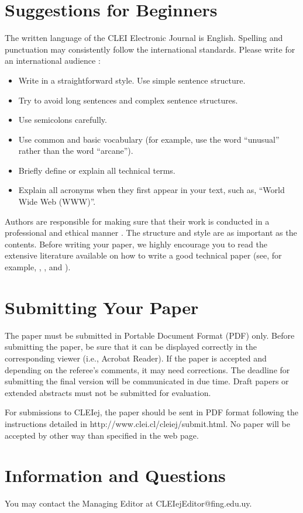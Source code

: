 \documentclass{cleiej}
\begin{document}
\section{Suggestions for Beginners}
The written language of the CLEI Electronic Journal is English. Spelling and punctuation 
may consistently follow the international standards. Please write for an international 
audience \cite{Smalzer}:
\begin{itemize}
\item Write in a straightforward style. Use simple sentence structure. 
\item Try to avoid long sentences and complex sentence structures. 
\item Use semicolons carefully.
\item Use common and basic vocabulary (for example, use the word ``unusual'' rather than the word ``arcane'').
\item Briefly define or explain all technical terms.
\item Explain all acronyms when they first appear in your text, such as, ``World Wide Web (WWW)''.
\end{itemize}
Authors are responsible for making sure that their work is conducted in a professional and ethical manner \cite{Anderson}.
The structure and style are as important as the contents. Before writing your paper, we highly encourage 
you to read the extensive literature available on how to write a good technical paper 
(see, for example, \cite{Harmon}, \cite{Pierson}, and \cite{Strunk}).

\section{Submitting Your Paper}
The paper must be submitted in Portable Document Format (PDF) only. Before submitting the paper, be sure that it can be displayed correctly in the corresponding viewer (i.e., Acrobat Reader). If the paper is accepted and depending on the referee's comments, it may need corrections. The deadline for submitting the final version will be communicated in due time. Draft papers or extended abstracts must not be submitted for evaluation. 

For submissions to CLEIej, the paper should be sent in PDF format following the instructions detailed in http://www.clei.cl/cleiej/submit.html. No paper will be accepted by other way than specified in the web page. 

\section{Information and Questions}
You may contact the Managing Editor at CLEIejEditor@fing.edu.uy.
\end{document}
